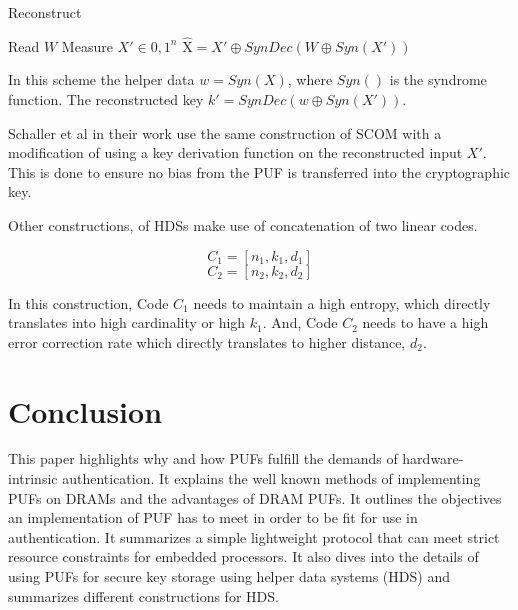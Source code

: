 \documentclass[journal, a4paper]{IEEEtran}
\begin{document}
\begin{algorithm}
    \caption{Reconstruct}
    \begin{algorithmic}[1]
        \STATE Read \(W\)
        \STATE Measure \(X' \in {0,1}^{n}\)
        \STATE \(\hat{\text{X}} = X' \oplus SynDec(W \oplus Syn(X'))\)
    \end{algorithmic}
\end{algorithm}

In this scheme the helper data \(w = Syn(X)\), where \(Syn()\) is the syndrome function. The reconstructed key \(k' = SynDec(w \oplus Syn(X'))\). 

Schaller et al in their work use the same construction of SCOM with a modification of using a key derivation function on the reconstructed input \(X'\). This is done to ensure no bias from the PUF is transferred into the cryptographic key.

Other constructions, of HDSs make use of concatenation of two linear codes. \cite{HDS15}

\[C_{1} = [n_{1}, k_{1}, d_{1}]\] 
\[C_{2} = [n_{2}, k_{2}, d_{2}]\]

In this construction, Code \(C_{1}\) needs to maintain a high entropy, which directly translates into high cardinality or high \(k_{1}\). And, Code \(C_{2}\) needs to have a high error correction rate which directly translates to higher distance, \(d_{2}\).

\section{Conclusion}
This paper highlights why and how PUFs fulfill the demands of hardware-intrinsic authentication. It explains the well known methods of implementing PUFs on DRAMs and the advantages of DRAM PUFs. It outlines the objectives an implementation of PUF has to meet in order to be fit for use in authentication. It summarizes a simple lightweight protocol that can meet strict resource constraints for embedded processors. It also dives into the details of using PUFs for secure key storage using helper data systems (HDS) and summarizes different constructions for HDS.
\end{document}
